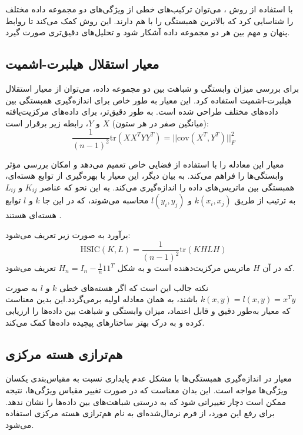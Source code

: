 با استفاده از روش
%
، می‌توان ترکیب‌های خطی از ویژگی‌های دو مجموعه داده مختلف را شناسایی کرد که بالاترین همبستگی را با هم دارند. این روش کمک می‌کند تا روابط پنهان و مهم بین هر دو مجموعه داده آشکار شود و تحلیل‌های دقیق‌تری صورت گیرد.







\subsection{
	معیار استقلال هیلبرت-اشمیت%
	}
برای بررسی میزان وابستگی و شباهت بین دو مجموعه داده، می‌توان از معیار استقلال هیلبرت-اشمیت استفاده کرد. این معیار به طور خاص برای اندازه‌گیری همبستگی بین داده‌های مختلف طراحی شده است. به طور دقیق‌تر، برای داده‌های مرکزیت‌یافته (میانگین صفر در هر ستون) \(X\) و \(Y\)، رابطه زیر برقرار است:
\begin{equation}
	\frac{1}{(n - 1)^2} \text{tr}(XX^TYY^T) = ||\text{cov}(X^T, Y^T)||_F^2
\end{equation}

معیار
این معادله را با استفاده از فضایی خاص تعمیم می‌دهد و امکان بررسی مؤثر وابستگی‌ها را فراهم می‌کند. به بیان دیگر، این معیار با بهره‌گیری از توابع هسته‌ای، همبستگی بین ماتریس‌های داده را اندازه‌گیری می‌کند. به این نحو که عناصر \(K_{ij}\) و \(L_{ij}\) به ترتیب از طریق \(k(x_i, x_j)\) و \(l(y_i, y_j)\) محاسبه می‌شوند، که در این جا \(k\) و \(l\) توابع هسته‌ای هستند
\cite{gretton2005measuring}.

برآورد
به صورت زیر تعریف می‌شود:
\begin{equation}
	\text{HSIC}(K, L) = \frac{1}{(n - 1)^2} \text{tr}(KHLH)
	\label{eq_HSIC}
\end{equation}
که در آن
\(H\)
ماتریس مرکزیت‌دهنده است و به شکل \(H_n = I_n - \frac{1}{n} 11^T\) تعریف می‌شود.

نکته جالب این است که اگر هسته‌های خطی \(k\) و \(l\) به صورت \(k(x, y) = l(x, y) = x^Ty\) باشند،
به همان معادله اولیه برمی‌گردد.این بدین معناست که معیار 
به‌طور دقیق و قابل اعتماد، میزان وابستگی و شباهت بین داده‌ها را ارزیابی کرده و به درک بهتر ساختارهای پیچیده داده‌ها کمک می‌کند.


\subsection{
	هم‌ترازی هسته مرکزی%
}
معیار
در اندازه‌گیری همبستگی‌ها با مشکل عدم پایداری نسبت به مقیاس‌بندی یکسان ویژگی‌ها مواجه است. این بدان معناست که در صورت تغییر مقیاس ویژگی‌ها، نتیجه
ممکن است دچار تغییراتی شود که به درستی شباهت‌های بین داده‌ها را نشان ندهد. برای رفع این مورد، از فرم نرمال‌شده‌ای به نام هم‌ترازی هسته مرکزی استفاده می‌شود.

